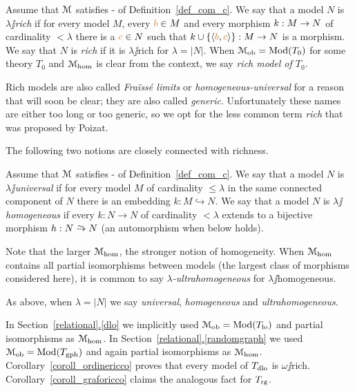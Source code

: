 \documentclass[creche.tex]{subfiles}
\begin{document}
\begin{definition}
Assume that $\EuScript M$ satisfies - of Definition~\ref{def_com_c}.
We say that a model $N$ is \emph{$\lambda\jj$rich\/} if for every model $M$, every ${\color{brown} b}\in M$ and every morphism $k:M\rightarrow N$ of cardinality $<\lambda$ there is a ${\color{brown} c}\in N$ such that $k\cup\{\langle{\color{brown}b},{\color{brown} c}\rangle\}:M\to N$ is a morphism.
We say that $N$ is \emph{rich\/} if it is $\lambda\jj$rich for $\lambda=|N|$.
When $\EuScript M_{\rm ob}=\mathop{\rm Mod}(T_0)$ for some theory $T_0$ and $\EuScript M_{\rm hom}$ is clear from the context, we say \emph{rich model of $T_0$}.\QED
\end{definition}

Rich models are also called \textit{Fra\"iss\'e limits} or \textit{homogeneous-universal\/} for a reason that will soon be clear; they are also called \textit{generic}.
Unfortunately these names are either too long or too generic, so we opt for the less common term \textit{rich\/} that was proposed by Poizat.

The following two notions are closely connected with richness.

\begin{definition}\label{def_omogenea_universale}
Assume that $\EuScript M$ satisfies - of Definition~\ref{def_com_c}.
We say that a model $N$ is \emph{$\lambda\jj$universal\/} if for every model $M$ of cardinality $\le\lambda$ in the same connected component of $N$ there is an embedding $k:M\hookrightarrow N$.
We say that a model $N$ is \emph{$\lambda\jj$homogeneous\/} if every $k:N\to N$ of cardinality $<\lambda$ extends to a bijective morphism $h:N\isomap N$ (an automorphism when  below holds).

Note that the larger $\EuScript M_{\rm hom}$, the stronger notion of homogeneity.
When  $\EuScript M_{\rm hom}$ contains all partial isomorphisms between models (the largest class of morphisms considered here), it is common to say \emph{$\lambda$-ultra\-homo\-geneous\/} for $\lambda\jj$homogeneous.

As above, when $\lambda=|N|$ we say \emph{universal}, \emph{homogeneous} and \emph{ultrahomogeneous}.\QED
\end{definition}


In Section~\hyperref[dlo]{\ref*{relational}.\ref*{dlo}} we implicitly used $\EuScript M_{\rm ob}=\mathop{\rm Mod}(T_{\rm lo})$ and partial isomorphisms as $\EuScript M_{\rm hom}$.
In Section~\hyperref[randomgraph]{\ref*{relational}.\ref*{randomgraph}} we used $\EuScript M_{\rm ob}=\mathop{\rm Mod}(T_{\rm gph})$ and again partial isomorphisms as $\EuScript M_{\rm hom}$.
Corollary~\ref{coroll_ordinericco} proves that every model of $T_{\rm dlo}$ is $\omega\jj$rich.
Corollary~\ref{coroll_graforicco} claims the analogous fact for $T_{\rm rg}$.
\end{document}
